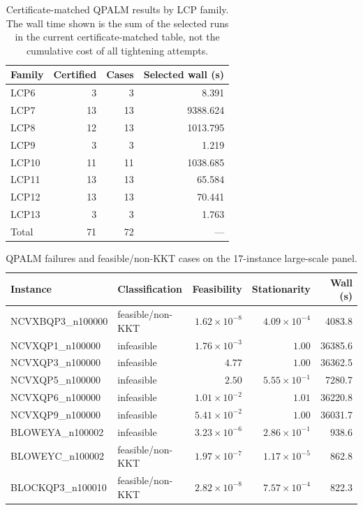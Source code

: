 \begin{table}[t]
\centering
\caption{Certificate-matched QPALM results by LCP family. The wall time shown is the sum of the selected runs in the current certificate-matched table, not the cumulative cost of all tightening attempts.}
\label{tab:lcp72-qpalm}
\begin{tabular}{lrrr}
\toprule
Family & Certified & Cases & Selected wall (s)\\
\midrule
LCP6  & 3  & 3  & 8.391\\
LCP7  & 13 & 13 & 9388.624\\
LCP8  & 12 & 13 & 1013.795\\
LCP9  & 3  & 3  & 1.219\\
LCP10 & 11 & 11 & 1038.685\\
LCP11 & 13 & 13 & 65.584\\
LCP12 & 13 & 13 & 70.441\\
LCP13 & 3  & 3  & 1.763\\
\midrule
Total & 71 & 72 & ---\\
\bottomrule
\end{tabular}
\end{table}

\begin{table}[t]
\centering
\caption{QPALM failures and feasible/non-KKT cases on the 17-instance large-scale panel.}
\label{tab:qpalm-xl17-failures}
\begin{tabular}{llrrr}
\toprule
Instance & Classification & Feasibility & Stationarity & Wall (s)\\
\midrule
NCVXBQP3\_n100000 & feasible/non-KKT & $1.62\times10^{-8}$ & $4.09\times10^{-4}$ & 4083.8\\
NCVXQP1\_n100000  & infeasible & $1.76\times10^{-3}$ & $1.00$ & 36385.6\\
NCVXQP3\_n100000  & infeasible & $4.77$ & $1.00$ & 36362.5\\
NCVXQP5\_n100000  & infeasible & $2.50$ & $5.55\times10^{-1}$ & 7280.7\\
NCVXQP6\_n100000  & infeasible & $1.01\times10^{-2}$ & $1.01$ & 36220.8\\
NCVXQP9\_n100000  & infeasible & $5.41\times10^{-2}$ & $1.00$ & 36031.7\\
BLOWEYA\_n100002  & infeasible & $3.23\times10^{-6}$ & $2.86\times10^{-1}$ & 938.6\\
BLOWEYC\_n100002  & feasible/non-KKT & $1.97\times10^{-7}$ & $1.17\times10^{-5}$ & 862.8\\
BLOCKQP3\_n100010 & feasible/non-KKT & $2.82\times10^{-8}$ & $7.57\times10^{-4}$ & 822.3\\
\bottomrule
\end{tabular}
\end{table}
